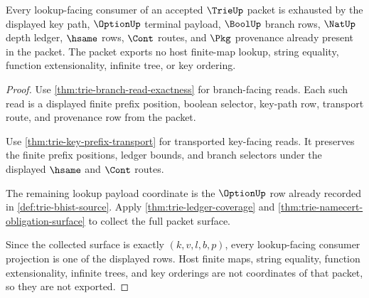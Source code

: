 \begin{theorem}\label{thm:trie-lookup-ledger-exhaustion}
Every lookup-facing consumer of an accepted $\TrieUp$ packet is exhausted by
the displayed key path, $\OptionUp$ terminal payload, $\BoolUp$ branch rows,
$\NatUp$ depth ledger, $\hsame$ rows, $\Cont$ routes, and $\Pkg$ provenance
already present in the packet. The packet exports no host finite-map lookup,
string equality, function extensionality, infinite tree, or key ordering.
\end{theorem}
\begin{proof}
Use \autoref{thm:trie-branch-read-exactness} for branch-facing reads. Each such
read is a displayed finite prefix position, boolean selector, key-path row,
transport route, and provenance row from the packet.

Use \autoref{thm:trie-key-prefix-transport} for transported key-facing reads.
It preserves the finite prefix positions, ledger bounds, and branch selectors
under the displayed $\hsame$ and $\Cont$ routes.

The remaining lookup payload coordinate is the $\OptionUp$ row already recorded
in \autoref{def:trie-bhist-source}. Apply \autoref{thm:trie-ledger-coverage}
and \autoref{thm:trie-namecert-obligation-surface} to collect the full packet
surface.

Since the collected surface is exactly $(k,v,l,b,p)$, every lookup-facing
consumer projection is one of the displayed rows. Host finite maps, string
equality, function extensionality, infinite trees, and key orderings are not
coordinates of that packet, so they are not exported.
\end{proof}

